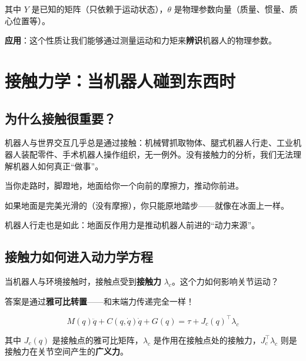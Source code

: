 其中 $Y$ 是已知的矩阵（只依赖于运动状态），$\theta$ 是物理参数向量（质量、惯量、质心位置等）。

\textbf{应用}：这个性质让我们能够通过测量运动和力矩来\textbf{辨识}机器人的物理参数。

\section{接触力学：当机器人碰到东西时}

\subsection{为什么接触很重要？}

机器人与世界交互几乎总是通过接触：机械臂抓取物体、腿式机器人行走、工业机器人装配零件、手术机器人操作组织，无一例外。没有接触力的分析，我们无法理解机器人如何真正“做事”。

\begin{example}[行走的秘密]
当你走路时，脚蹬地，地面给你一个向前的摩擦力，推动你前进。

如果地面是完美光滑的（没有摩擦），你只能原地踏步——就像在冰面上一样。

机器人行走也是如此：地面反作用力是推动机器人前进的“动力来源”。
\end{example}

\subsection{接触力如何进入动力学方程}

当机器人与环境接触时，接触点受到\textbf{接触力} $\lambda_c$。这个力如何影响关节运动？

答案是通过\textbf{雅可比转置}——和末端力传递完全一样！

\begin{keyformula}[title=带接触的动力学方程]
\begin{equation}
M(q)\ddot{q} + C(q,\dot{q})\dot{q} + G(q) = \tau + J_c(q)^\top \lambda_c
\end{equation}

其中 $J_c(q)$ 是接触点的雅可比矩阵，$\lambda_c$ 是作用在接触点处的接触力，$J_c^\top \lambda_c$ 则是接触力在关节空间产生的\textbf{广义力}。
\end{keyformula}

